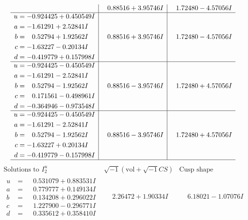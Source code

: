 \documentclass[1p]{elsarticle_modified}
\theoremstyle{definition}
\newcommand{\I}{\sqrt{-1}}
\begin{document}
$$\begin{array}{c|c|c}
 & \phantom{-}0.88516 + 3.95746 I & \phantom{-}1.72480 - 4.57056 I \\ \hline\begin{aligned}
u &= -0.924425 + 0.450549 I \\
a &= -1.61291 + 2.52841 I \\
b &= \phantom{-}0.52794 + 1.92562 I \\
c &= -1.63227 - 0.20134 I \\
d &= -0.419779 + 0.157998 I\end{aligned}
 & \phantom{-}0.88516 + 3.95746 I & \phantom{-}1.72480 - 4.57056 I \\ \hline\begin{aligned}
u &= -0.924425 - 0.450549 I \\
a &= -1.61291 - 2.52841 I \\
b &= \phantom{-}0.52794 - 1.92562 I \\
c &= \phantom{-}0.171561 - 0.498961 I \\
d &= -0.364946 - 0.973548 I\end{aligned}
 & \phantom{-}0.88516 - 3.95746 I & \phantom{-}1.72480 + 4.57056 I \\ \hline\begin{aligned}
u &= -0.924425 - 0.450549 I \\
a &= -1.61291 - 2.52841 I \\
b &= \phantom{-}0.52794 - 1.92562 I \\
c &= -1.63227 + 0.20134 I \\
d &= -0.419779 - 0.157998 I\end{aligned}
 & \phantom{-}0.88516 - 3.95746 I & \phantom{-}1.72480 + 4.57056 I\\
 \hline 
 \end{array}$$\newpage$$\begin{array}{c|c|c}  
\text{Solutions to }I^u_{2}& \I (\text{vol} + \sqrt{-1}CS) & \text{Cusp shape}\\
 \hline 
\begin{aligned}
u &= \phantom{-}0.531079 + 0.883531 I \\
a &= \phantom{-}0.779777 + 0.149134 I \\
b &= \phantom{-}0.134208 + 0.296022 I \\
c &= \phantom{-}1.227900 - 0.296771 I \\
d &= \phantom{-}0.335612 + 0.358410 I\end{aligned}
 & \phantom{-}2.26472 + 1.90334 I & \phantom{-}6.18021 - 1.07076 I \\ \hline\begin{aligned}

\end{aligned}
\end{array}$$
\end{document}
